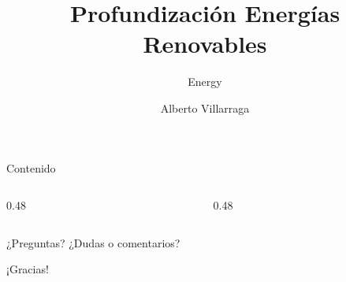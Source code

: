 \documentclass[../main.tex]{subfiles}
\title{Profundización Energías Renovables}
\subtitle{Energy}
\author{Alberto Villarraga}
\institute{\Large Ingeniería de Procesos}
\begin{document}
\maketitle
\begin{frame}{Contenido }
  \begin{columns}
    \begin{column}{0.48\textwidth}
      \tableofcontents[sections=1-8]
    \end{column}
    \begin{column}{0.48\textwidth}
      \tableofcontents[sections=9-]
    \end{column}
  \end{columns}
\end{frame}
%
%
%

%
% 
\begin{frame}{¿Preguntas?}
\centering
\Large
¿Dudas o comentarios?
\end{frame}

\begin{frame}[standout]
\Huge ¡Gracias!
\end{frame}
\end{document}
